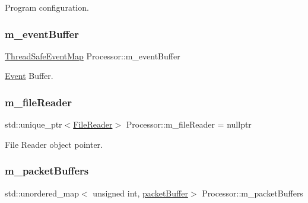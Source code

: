 Program configuration. 

\mbox{\label{class_processor_a7cb15fbab19fceb6bc5a607629ff5040}} 
\subsubsection{\texorpdfstring{m\+\_\+event\+Buffer}{m\_eventBuffer}}
{\footnotesize\ttfamily \hyperlink{class_thread_safe_event_map}{Thread\+Safe\+Event\+Map} Processor\+::m\+\_\+event\+Buffer\hspace{0.3cm}{\ttfamily [private]}}



\hyperlink{class_event}{Event} Buffer. 

\mbox{\label{class_processor_aafe2ae55e609005c0e88226f1dd1dcb5}} 
\subsubsection{\texorpdfstring{m\+\_\+file\+Reader}{m\_fileReader}}
{\footnotesize\ttfamily std\+::unique\+\_\+ptr$<$\hyperlink{class_file_reader}{File\+Reader}$>$ Processor\+::m\+\_\+file\+Reader = nullptr\hspace{0.3cm}{\ttfamily [private]}}



File Reader object pointer. 

\mbox{\label{class_processor_ab75c789ec03e38e8621f000332daa285}} 
\subsubsection{\texorpdfstring{m\+\_\+packet\+Buffers}{m\_packetBuffers}}
{\footnotesize\ttfamily std\+::unordered\+\_\+map$<$ unsigned int, \hyperlink{class_processor_a0cfd8ed0721769db91c142a19a392e0f}{packet\+Buffer}$>$ Processor\+::m\+\_\+packet\+Buffers\hspace{0.3cm}{\ttfamily [private]}}



